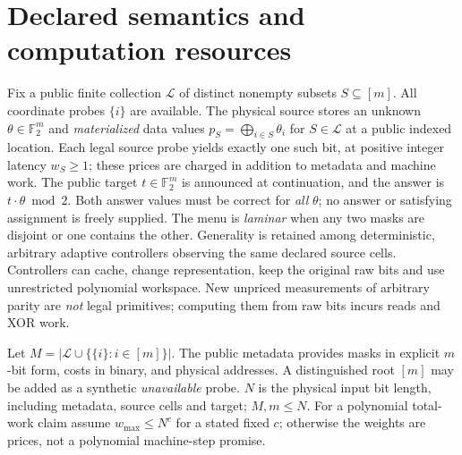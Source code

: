\documentclass[11pt]{article}
\begin{document}
\section{Declared semantics and computation resources}
Fix a public finite collection $\mathcal L$ of distinct nonempty subsets $S\subseteq[m]$. All coordinate probes $\{i\}$ are available. The physical source stores an unknown $\theta\in\mathbb F_2^m$ and \emph{materialized} data values $p_S=\bigoplus_{i\in S}\theta_i$ for $S\in\mathcal L$ at a public indexed location. Each legal source probe yields exactly one such bit, at positive integer latency $w_S\ge1$; these prices are charged in addition to metadata and machine work. The public target $t\in\mathbb F_2^m$ is announced at continuation, and the answer is $t\cdot\theta\bmod2$. Both answer values must be correct for \emph{all} $\theta$; no answer or satisfying assignment is freely supplied. The menu is \emph{laminar} when any two masks are disjoint or one contains the other. Generality is retained among deterministic, arbitrary adaptive controllers observing the same declared source cells. Controllers can cache, change representation, keep the original raw bits and use unrestricted polynomial workspace. New unpriced measurements of arbitrary parity are \emph{not} legal primitives; computing them from raw bits incurs reads and XOR work.

Let $M=|\mathcal L\cup\{\{i\}:i\in[m]\}|$. The public metadata provides masks in explicit $m$-bit form, costs in binary, and physical addresses. A distinguished root $[m]$ may be added as a synthetic \emph{unavailable} probe. $N$ is the physical input bit length, including metadata, source cells and target; $M,m\le N$. For a polynomial total-work claim assume $w_{\max}\le N^c$ for a stated fixed $c$; otherwise the weights are prices, not a polynomial machine-step promise.
\end{document}
